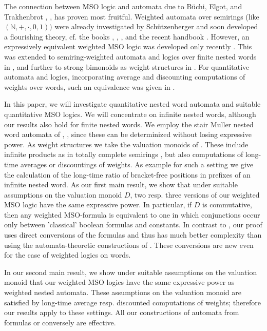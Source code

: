 \documentclass[runningheads, envcountsame, a4paper]{llncs}
\begin{document}
The connection between MSO logic and automata due to
B\"uchi, Elgot, and Trakhenbrot \cite{Bue}, \cite{Elg}, \cite{Tra} has proven most
fruitful. Weighted automata over semirings (like $(\mathbb{N},+,\cdot,0,1))$
were already investigated by Sch\"utzenberger \cite{Sch} and
soon developed a flourishing theory, cf. the books
\cite{BR}, \cite{Eil}, \cite{KS}, \cite{SS} and the recent handbook \cite{DKV}.
However, an expressively equivalent weighted MSO logic was
developed only recently \cite{DG}. This was extended to
semiring-weighted automata and logics over finite nested words
in \cite{Ma}, and further to strong bimonoids as weight structures
in \cite{DP}. For quantitative automata and logics, incorporating
average and discounting computations of weights over words,
such an equivalence was given in \cite{DM}.

In this paper, we will investigate quantitative nested word
automata and suitable quantitative MSO logics. We will
concentrate on infinite nested words, although our
results also hold for finite nested words. We employ the stair
Muller nested word automata of \cite{AM}, \cite{LMS}, since these
can be determinized without losing expressive power. As weight structures
we take the valuation monoids of \cite{DM}. These include
infinite products as in totally complete semirings \cite{DR}, but also
computations of long-time averages or discountings of weights. As example for such a setting
we give the calculation of the long-time ratio of
bracket-free positions in prefixes of an infinite nested word.
As our first main result, we show that under suitable assumptions
on the valuation monoid $D$, two resp. three versions of our
weighted MSO logic have the same expressive power.
In particular, if $D$ is commutative, then any weighted MSO-formula is equivalent
to one in which conjunctions occur only between 'classical'
boolean formulas and constants.
In contrast
to \cite{DM}, our proof uses direct conversions of the formulas
and thus has much better complexity than using the
automata-theoretic constructions of \cite{DM}.
These conversions are new even for the case of weighted logics on words. 


In our second main result, we show under suitable assumptions
on the valuation monoid that our weighted MSO logics have
the same expressive power as weighted nested automata.
These assumptions on the valuation monoid are satisfied by
long-time average resp. discounted computations of weights;
therefore our results apply to these settings.
All our constructions of automata from formulas or conversely
are effective.
\end{document}
